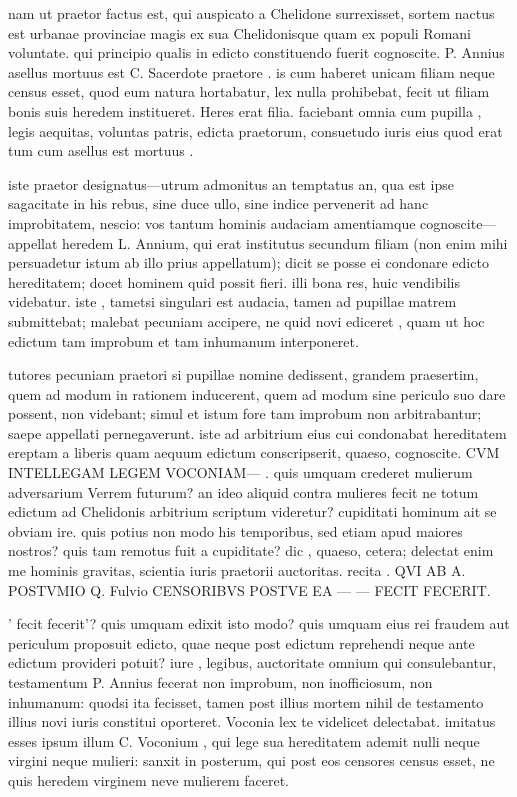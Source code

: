  nam ut praetor factus est, qui auspicato a Chelidone surrexisset, sortem nactus est urbanae provinciae magis ex sua Chelidonisque quam ex populi Romani voluntate. qui principio qualis in edicto constituendo fuerit cognoscite. P. Annius asellus mortuus est C. Sacerdote praetore . is cum haberet unicam filiam neque census esset, quod eum natura hortabatur, lex nulla prohibebat, fecit ut filiam bonis suis heredem institueret. Heres erat filia. faciebant omnia cum pupilla , legis aequitas, voluntas patris, edicta praetorum, consuetudo iuris eius quod erat tum cum asellus est mortuus .

 iste praetor designatus—utrum admonitus an temptatus an, qua est ipse sagacitate in his rebus, sine duce ullo, sine indice pervenerit ad hanc improbitatem, nescio: vos tantum hominis audaciam amentiamque cognoscite—appellat heredem L. Annium, qui erat institutus secundum filiam (non enim mihi persuadetur istum ab illo prius appellatum); dicit se posse ei condonare edicto hereditatem; docet hominem quid possit fieri. illi bona res, huic vendibilis videbatur. iste , tametsi singulari est audacia, tamen ad pupillae matrem submittebat; malebat pecuniam accipere, ne quid novi ediceret , quam ut hoc edictum tam improbum et tam inhumanum interponeret.

 tutores pecuniam praetori si pupillae nomine dedissent, grandem praesertim, quem ad modum in rationem inducerent, quem ad modum sine periculo suo dare possent, non videbant; simul et istum fore tam improbum non arbitrabantur; saepe appellati pernegaverunt. iste ad arbitrium eius cui condonabat hereditatem ereptam a liberis quam aequum edictum conscripserit, quaeso, cognoscite. CVM INTELLEGAM LEGEM VOCONIAM— . quis umquam crederet mulierum adversarium Verrem futurum? an ideo aliquid contra mulieres fecit ne totum edictum ad Chelidonis arbitrium scriptum videretur? cupiditati hominum ait se obviam ire. quis potius non modo his temporibus, sed etiam apud maiores nostros? quis tam remotus fuit a cupiditate? dic , quaeso, cetera; delectat enim me hominis gravitas, scientia iuris praetorii auctoritas. recita . QVI AB A. POSTVMIO Q. Fulvio CENSORIBVS POSTVE EA — — FECIT FECERIT.

 ' fecit fecerit'? quis umquam edixit isto modo? quis umquam eius rei fraudem aut periculum proposuit edicto, quae neque post edictum reprehendi neque ante edictum provideri potuit? iure , legibus, auctoritate omnium qui consulebantur, testamentum P. Annius fecerat non improbum, non inofficiosum, non inhumanum: quodsi ita fecisset, tamen post illius mortem nihil de testamento illius novi iuris constitui oporteret. Voconia lex te videlicet delectabat. imitatus esses ipsum illum C. Voconium , qui lege sua hereditatem ademit nulli neque virgini neque mulieri: sanxit in posterum, qui post eos censores census esset, ne quis heredem virginem neve mulierem faceret.

